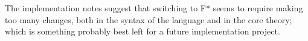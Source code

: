\documentclass[acmsmall,nonacm,timestamp,review=false,anonymous=false]{acmart}
\begin{document}
The implementation notes suggest that switching to F* seems to require making too many changes, both in the syntax of the language and in the core theory; which is something probably best left for a future implementation project.

\end{document}
